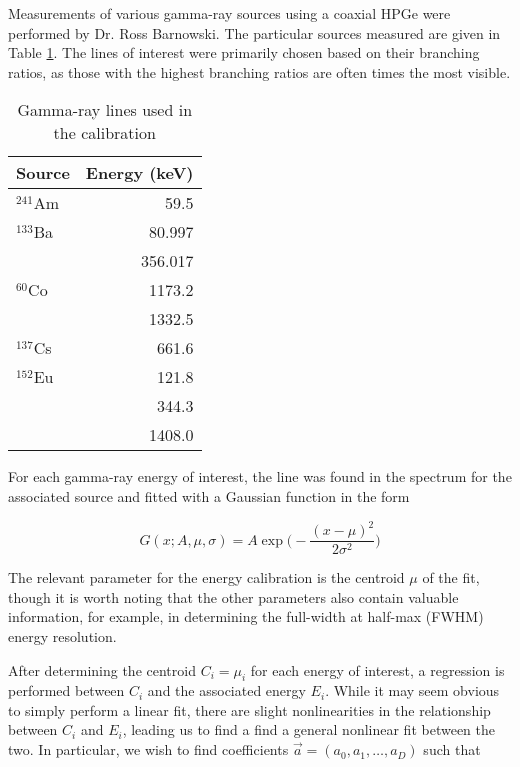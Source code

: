 Measurements of various gamma-ray sources using a coaxial HPGe were performed
by Dr. Ross Barnowski. The particular sources measured are given in Table
\ref{tab:src}. The lines of interest were primarily chosen based on their
branching ratios, as those with the highest branching ratios are often times
the most visible.

\begin{table}[H] \label{tab:src}
  \begin{center}
    \begin{tabular}{l|r}
      \textbf{Source} & \textbf{Energy (keV)}\\
      \hline
      $^{241}$Am    &  59.5    \\
      $^{133}$Ba    &  80.997  \\
                    &  356.017 \\
      $^{60}$Co     &  1173.2  \\
                    &  1332.5  \\
      $^{137}$Cs    &  661.6   \\
      $^{152}$Eu    &  121.8   \\
                    &  344.3   \\
                    &  1408.0  \\
    \end{tabular}
    \caption{Gamma-ray lines used in the calibration}
  \end{center}
\end{table}

For each gamma-ray energy of interest, the line was found in the spectrum for
the associated source and fitted with a Gaussian function in the form

\begin{equation}
G(x; A, \mu, \sigma) = A\exp\big(-\frac{(x-\mu)^2}{2\sigma^2}\big)
\end{equation}

The relevant parameter for the energy calibration is the centroid $\mu$ of the fit,
though it is worth noting that the other parameters also contain valuable information,
for example, in determining the full-width at half-max (FWHM) energy resolution.

After determining the centroid $C_i = \mu_i$ for each energy of interest, a
regression is performed between $C_i$ and the associated energy $E_i$. While it
may seem obvious to simply perform a linear fit, there are slight nonlinearities
in the relationship between $C_i$ and $E_i$, leading us to find a find a general
nonlinear fit between the two. In particular, we wish to find coefficients
$\vec{a} = (a_0, a_1, \dots, a_D)$ such that

